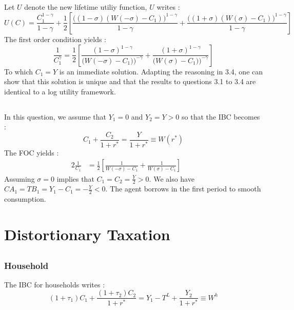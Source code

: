 \documentclass{article}
\begin{document}
\subsection{}
Let $U$ denote the new lifetime utiliy function, $U$ writes :
\begin{equation}
    U(C) = \frac{C_1^{1-\gamma}}{1-\gamma} + \frac{1}{2}\left[  \frac{\Big((1-\sigma)(W(-\sigma)-C_1)\Big)^{1-\gamma}}{1-\gamma} + \frac{\Big((1+\sigma)(W(\sigma)-C_1)\Big)^{1-\gamma}}{1-\gamma}\right] 
\end{equation}
The first order condition yields :
\begin{equation}
    \frac{1}{C_1^{\gamma}} = \frac{1}{2} \left[ \frac{(1-\sigma)^{1-\gamma}}{\Big(W(-\sigma) - C_1)\Big)^{-\gamma}} + \frac{(1+\sigma)^{1-\gamma}}{\Big(W(\sigma) - C_1)\Big)^{-\gamma}}  \right]
\end{equation}
To which $C_1 = Y$ is an immediate solution.
Adapting the reasoning in 3.4, one can show that this solution is unique and that the results to questions 3.1 to 3.4 are identical to a log utility framework.
\subsection{}
In this question, we assume that $Y_1 = 0$ and $Y_2 = Y > 0$ so that the IBC becomes :
\begin{equation}
    C_1 + \frac{C_2}{1 + r^*} = \frac{Y}{1 + r^*} \equiv W(r^*)
\end{equation}
The FOC yields :
\begin{alignat}{2}
    \frac{1}{C_1}  &= \frac{1}{2}\left[ \frac{1}{W(-\sigma)-C_1} + \frac{1}{W(\sigma)- C_1}  \right]   &\quad\
\end{alignat}
Assuming $\sigma = 0$ implies that $\displaystyle C_1 = C_2 = \frac{Y}{2} > 0$.\newline
We also have $\displaystyle CA_1 = TB_1 = Y_1 - C_1 = - \frac{Y}{2} < 0$.\newline
The agent borrows in the first period to smooth consumption.




\newpage
\section{Distortionary Taxation}
\subsection{}
\subsubsection*{Household}
The IBC for households writes :
\begin{equation}
    (1 + \tau_1)C_1 + \frac{(1+\tau_2)C_2}{1+r^*} = Y_1 - T^L + \frac{Y_2}{1+r^*} \equiv W^h
\end{equation}
\end{document}
